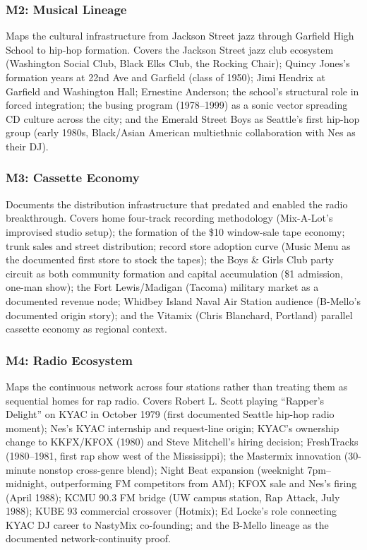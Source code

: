 \documentclass[11pt,letterpaper]{article}
\begin{document}
\subsubsection{M2: Musical Lineage}

Maps the cultural infrastructure from Jackson Street jazz through Garfield High School to hip-hop formation. Covers the Jackson Street jazz club ecosystem (Washington Social Club, Black Elks Club, the Rocking Chair); Quincy Jones's formation years at 22nd Ave and Garfield (class of 1950); Jimi Hendrix at Garfield and Washington Hall; Ernestine Anderson; the school's structural role in forced integration; the busing program (1978--1999) as a sonic vector spreading CD culture across the city; and the Emerald Street Boys as Seattle's first hip-hop group (early 1980s, Black/Asian American multiethnic collaboration with Nes as their DJ).

\subsubsection{M3: Cassette Economy}

Documents the distribution infrastructure that predated and enabled the radio breakthrough. Covers home four-track recording methodology (Mix-A-Lot's improvised studio setup); the formation of the \$10 window-sale tape economy; trunk sales and street distribution; record store adoption curve (Music Menu as the documented first store to stock the tapes); the Boys \& Girls Club party circuit as both community formation and capital accumulation (\$1 admission, one-man show); the Fort Lewis/Madigan (Tacoma) military market as a documented revenue node; Whidbey Island Naval Air Station audience (B-Mello's documented origin story); and the Vitamix (Chris Blanchard, Portland) parallel cassette economy as regional context.

\subsubsection{M4: Radio Ecosystem}

Maps the continuous network across four stations rather than treating them as sequential homes for rap radio. Covers Robert L. Scott playing ``Rapper's Delight'' on KYAC in October 1979 (first documented Seattle hip-hop radio moment); Nes's KYAC internship and request-line origin; KYAC's ownership change to KKFX/KFOX (1980) and Steve Mitchell's hiring decision; FreshTracks (1980--1981, first rap show west of the Mississippi); the Mastermix innovation (30-minute nonstop cross-genre blend); Night Beat expansion (weeknight 7pm--midnight, outperforming FM competitors from AM); KFOX sale and Nes's firing (April 1988); KCMU 90.3 FM bridge (UW campus station, Rap Attack, July 1988); KUBE 93 commercial crossover (Hotmix); Ed Locke's role connecting KYAC DJ career to NastyMix co-founding; and the B-Mello lineage as the documented network-continuity proof.
\end{document}
